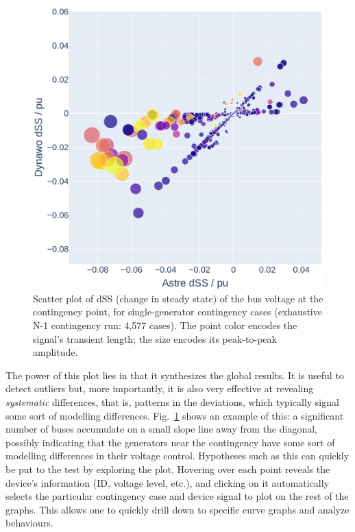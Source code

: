 \documentclass[conference]{IEEEtran}
\begin{document}
\begin{figure}
  \centering
  \includegraphics[width=\columnwidth]{figs/Ubus_dSS_GENS_20210211-0930_moreT600}
  \caption{Scatter plot of dSS (change in steady state) of the bus voltage at
    the contingency point, for single-generator contingency cases (exhaustive
    N-1 contingency run: 4,577 cases). The point color encodes the signal's
    transient length; the size encodes its peak-to-peak amplitude.}
  \label{fig:bubbleplot1}
\end{figure}

The power of this plot lies in that it synthesizes the global results.  It is
useful to detect outliers but, more importantly, it is also very effective at
revealing \emph{systematic} differences, that is, patterns in the deviations,
which typically signal some sort of modelling
differences. Fig.~\ref{fig:bubbleplot1} shows an example of this: a significant
number of buses accumulate on a small slope line away from the diagonal,
possibly indicating that the generators near the contingency have some sort of
modelling differences in their voltage control. Hypotheses such as this can
quickly be put to the test by exploring the plot. Hovering over each point
reveals the device's information (ID, voltage level, etc.), and clicking on it
automatically selects the particular contingency case and device signal to plot
on the rest of the graphs. This allows one to quickly drill down to specific
curve graphs and analyze behaviours.
\end{document}
